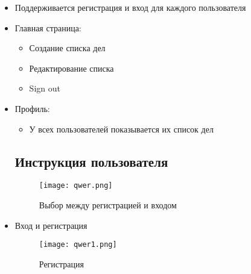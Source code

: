 \documentclass[a4paper,14pt]{extarticle} %
\begin{document}
\begin{itemize} 
    \item{Поддерживается регистрация и вход для каждого пользователя}
    \item{Главная страница:} 
    \begin{itemize} 
        \item{Создание списка дел}
        \item{Редактирование списка}
        \item{Sign out}
    \end{itemize} 
    \item{Профиль:}
    \begin{itemize}
        \item{У всех пользователей показывается их список дел}
    \end{itemize}
\subsection{Инструкция пользователя}
    \begin{figure}[H]
        \centering\texttt{[image: qwer.png]}
        \caption{Выбор между регистрацией и входом}
    \end{figure}
    \item{Вход и регистрация}
    \begin{figure}[H]
        \centering\texttt{[image: qwer1.png]}
        \caption{Регистрация}
    \end{figure}


\end{itemize}
\end{document}

